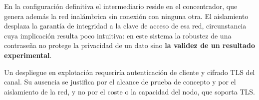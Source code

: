 En la configuración definitiva el intermediario reside en el concentrador, que genera además la
red inalámbrica sin conexión con ninguna otra. El aislamiento desplaza la garantía de integridad
a la clave de acceso de esa red, circunstancia cuya implicación resulta poco intuitiva: en este
sistema la robustez de una contraseña no protege la privacidad de un dato sino \textbf{la validez
de un resultado experimental}.

Un despliegue en explotación requeriría autenticación de cliente y cifrado TLS del canal. Su
ausencia se justifica por el alcance de prueba de concepto y por el aislamiento de la red, y no
por el coste o la capacidad del nodo, que soporta TLS.
